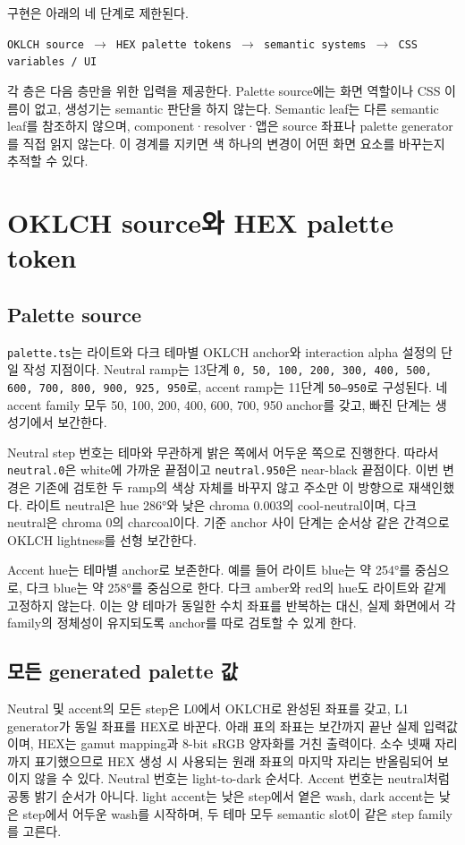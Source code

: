 \documentclass[11pt,titlepage]{article}
\begin{document}
구현은 아래의 네 단계로 제한된다.

\begin{center}
\texttt{OKLCH source $\rightarrow$ HEX palette tokens $\rightarrow$ semantic systems $\rightarrow$ CSS variables / UI}
\end{center}

각 층은 다음 층만을 위한 입력을 제공한다. Palette source에는 화면 역할이나 CSS 이름이 없고, 생성기는 semantic 판단을 하지 않는다. Semantic leaf는 다른 semantic leaf를 참조하지 않으며, component·resolver·앱은 source 좌표나 palette generator를 직접 읽지 않는다. 이 경계를 지키면 색 하나의 변경이 어떤 화면 요소를 바꾸는지 추적할 수 있다\cite{architecture}.

\section{OKLCH source와 HEX palette token}

\subsection{Palette source}

\texttt{palette.ts}는 라이트와 다크 테마별 OKLCH anchor와 interaction alpha 설정의 단일 작성 지점이다. Neutral ramp는 13단계 \texttt{0, 50, 100, 200, 300, 400, 500, 600, 700, 800, 900, 925, 950}로, accent ramp는 11단계 \texttt{50--950}로 구성된다. 네 accent family 모두 50, 100, 200, 400, 600, 700, 950 anchor를 갖고, 빠진 단계는 생성기에서 보간한다\cite{palette}.

Neutral step 번호는 테마와 무관하게 밝은 쪽에서 어두운 쪽으로 진행한다. 따라서 \texttt{neutral.0}은 white에 가까운 끝점이고 \texttt{neutral.950}은 near-black 끝점이다. 이번 변경은 기존에 검토한 두 ramp의 색상 자체를 바꾸지 않고 주소만 이 방향으로 재색인했다. 라이트 neutral은 hue 286°와 낮은 chroma 0.003의 cool-neutral이며, 다크 neutral은 chroma 0의 charcoal이다. 기준 anchor 사이 단계는 순서상 같은 간격으로 OKLCH lightness를 선형 보간한다\cite{palette}.

Accent hue는 테마별 anchor로 보존한다. 예를 들어 라이트 blue는 약 254°를 중심으로, 다크 blue는 약 258°를 중심으로 한다. 다크 amber와 red의 hue도 라이트와 같게 고정하지 않는다. 이는 양 테마가 동일한 수치 좌표를 반복하는 대신, 실제 화면에서 각 family의 정체성이 유지되도록 anchor를 따로 검토할 수 있게 한다\cite{palette}.

\subsection{모든 generated palette 값}
Neutral 및 accent의 모든 step은 L0에서 OKLCH로 완성된 좌표를 갖고, L1 generator가 동일 좌표를 HEX로 바꾼다. 아래 표의 좌표는 보간까지 끝난 실제 입력값이며, HEX는 gamut mapping과 8-bit sRGB 양자화를 거친 출력이다. 소수 넷째 자리까지 표기했으므로 HEX 생성 시 사용되는 원래 좌표의 마지막 자리는 반올림되어 보이지 않을 수 있다. Neutral 번호는 light-to-dark 순서다. Accent 번호는 neutral처럼 공통 밝기 순서가 아니다. light accent는 낮은 step에서 옅은 wash, dark accent는 낮은 step에서 어두운 wash를 시작하며, 두 테마 모두 semantic slot이 같은 step family를 고른다.
\end{document}
